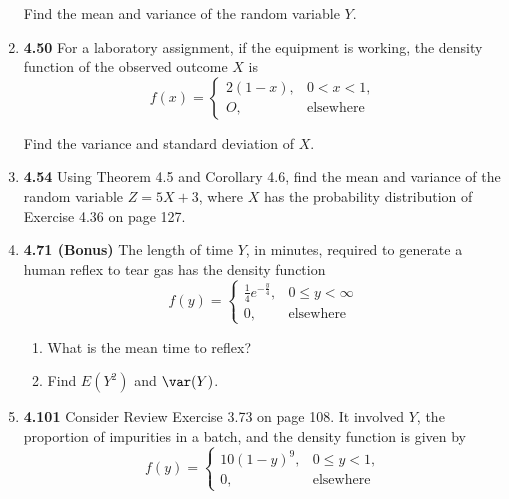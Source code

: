 \documentclass[basic, header]{nosvagor-notes}
\begin{document}
\begin{enumerate}[leftmargin=1.5em, itemsep=4em]
    Find the mean and variance of the random variable \(Y\).

  \item \textbf{4.50} For a laboratory assignment, if the equipment is working,
    the density function of the observed outcome \(X\) is
    \[%
      f(x) =
      \begin{cases}
        2(1-x), & 0 < x < 1, \\
        O,      & \text{elsewhere}
      \end{cases}
    \]%

    Find the variance and standard deviation of \(X\).

  \newpage %

  \item \textbf{4.54} Using Theorem 4.5 and Corollary 4.6, find the mean and
    variance of the random variable \(Z = 5X +3\), where \(X\) has the probability
    distribution of Exercise 4.36 on page 127.

  \item \textbf{4.71 (Bonus)} The length of time \(Y\), in minutes, required
    to generate a human reflex to tear gas has the density function
    \[%
      f(y) =
      \begin{cases}
        \frac{1}{4}e^{-\frac{y}{4}}, & 0 \leq y < \infty \\
         0, & \text{elsewhere}
      \end{cases}
    \]%
    \begin{enumerate}[leftmargin=1.6em]

      \item What is the mean time to reflex?

      \item Find \(E(Y^2)\) and \(\var(Y)\).

    \end{enumerate}

  \item \textbf{4.101} Consider Review Exercise 3.73 on page 108. It
    involved \(Y\), the proportion of impurities in a batch, and the density
    function is given by
    \[%
      f(y) =
      \begin{cases}
        10(1-y)^9,			& 0 \leq y < 1, \\
        0, & \text{elsewhere}
      \end{cases}
    \]%
    \begin{enumerate}[leftmargin=1.6em]


\end{enumerate}
\end{enumerate}
\end{document}
